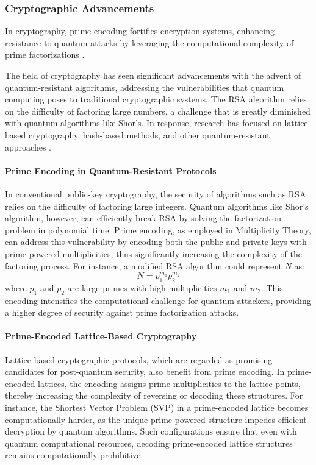 \documentclass{article}
\begin{document}
\subsubsection{Cryptographic Advancements}
In cryptography, prime encoding fortifies encryption systems, enhancing resistance to quantum attacks by leveraging the computational complexity of prime factorizations \cite{freeman2004}.

The field of cryptography has seen significant advancements with the advent of quantum-resistant algorithms, addressing the vulnerabilities that quantum computing poses to traditional cryptographic systems. The RSA algorithm \cite{rivest1978} relies on the difficulty of factoring large numbers, a challenge that is greatly diminished with quantum algorithms like Shor’s. In response, research has focused on lattice-based cryptography, hash-based methods, and other quantum-resistant approaches \cite{micciancio2002}. 

\paragraph{Prime Encoding in Quantum-Resistant Protocols}

In conventional public-key cryptography, the security of algorithms such as RSA relies on the difficulty of factoring large integers. Quantum algorithms like Shor’s algorithm, however, can efficiently break RSA by solving the factorization problem in polynomial time. Prime encoding, as employed in Multiplicity Theory, can address this vulnerability by encoding both the public and private keys with prime-powered multiplicities, thus significantly increasing the complexity of the factoring process. For instance, a modified RSA algorithm could represent \( N \) as:
\[
N = p_1^{m_1} p_2^{m_2}
\]
where \( p_1 \) and \( p_2 \) are large primes with high multiplicities \( m_1 \) and \( m_2 \). This encoding intensifies the computational challenge for quantum attackers, providing a higher degree of security against prime factorization attacks.

\paragraph{Prime-Encoded Lattice-Based Cryptography}

Lattice-based cryptographic protocols, which are regarded as promising candidates for post-quantum security, also benefit from prime encoding. In prime-encoded lattices, the encoding assigns prime multiplicities to the lattice points, thereby increasing the complexity of reversing or decoding these structures. For instance, the Shortest Vector Problem (SVP) in a prime-encoded lattice becomes computationally harder, as the unique prime-powered structure impedes efficient decryption by quantum algorithms. Such configurations ensure that even with quantum computational resources, decoding prime-encoded lattice structures remains computationally prohibitive.
\end{document}
